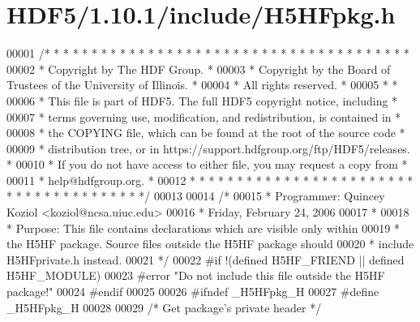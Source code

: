 \hypertarget{_h_d_f5_21_810_81_2include_2_h5_h_fpkg_8h_source}{}\section{H\+D\+F5/1.10.1/include/\+H5\+H\+Fpkg.h}
\label{_h_d_f5_21_810_81_2include_2_h5_h_fpkg_8h_source}

\begin{DoxyCode}
00001 \textcolor{comment}{/* * * * * * * * * * * * * * * * * * * * * * * * * * * * * * * * * * * * * * *}
00002 \textcolor{comment}{ * Copyright by The HDF Group.                                               *}
00003 \textcolor{comment}{ * Copyright by the Board of Trustees of the University of Illinois.         *}
00004 \textcolor{comment}{ * All rights reserved.                                                      *}
00005 \textcolor{comment}{ *                                                                           *}
00006 \textcolor{comment}{ * This file is part of HDF5.  The full HDF5 copyright notice, including     *}
00007 \textcolor{comment}{ * terms governing use, modification, and redistribution, is contained in    *}
00008 \textcolor{comment}{ * the COPYING file, which can be found at the root of the source code       *}
00009 \textcolor{comment}{ * distribution tree, or in https://support.hdfgroup.org/ftp/HDF5/releases.  *}
00010 \textcolor{comment}{ * If you do not have access to either file, you may request a copy from     *}
00011 \textcolor{comment}{ * help@hdfgroup.org.                                                        *}
00012 \textcolor{comment}{ * * * * * * * * * * * * * * * * * * * * * * * * * * * * * * * * * * * * * * */}
00013 
00014 \textcolor{comment}{/*}
00015 \textcolor{comment}{ * Programmer:  Quincey Koziol <koziol@ncsa.uiuc.edu>}
00016 \textcolor{comment}{ *      Friday, February 24, 2006}
00017 \textcolor{comment}{ *}
00018 \textcolor{comment}{ * Purpose: This file contains declarations which are visible only within}
00019 \textcolor{comment}{ *      the H5HF package.  Source files outside the H5HF package should}
00020 \textcolor{comment}{ *      include H5HFprivate.h instead.}
00021 \textcolor{comment}{ */}
00022 \textcolor{preprocessor}{#if !(defined H5HF\_FRIEND || defined H5HF\_MODULE)}
00023 \textcolor{preprocessor}{#error "Do not include this file outside the H5HF package!"}
00024 \textcolor{preprocessor}{#endif}
00025 
00026 \textcolor{preprocessor}{#ifndef \_H5HFpkg\_H}
00027 \textcolor{preprocessor}{#define \_H5HFpkg\_H}
00028 
00029 \textcolor{comment}{/* Get package's private header */}

\end{DoxyCode}
